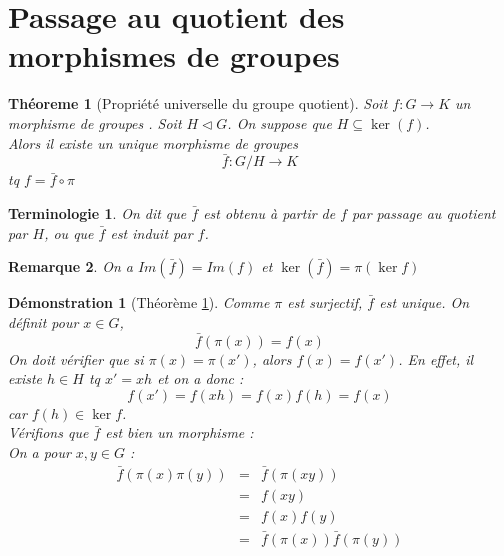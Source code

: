 \documentclass[a4paper, oneside]{report}
\theoremstyle{break}
\newtheorem{thm}{Théoreme}[section] %
\newtheorem{remar}[thm]{Remarque}
\newtheorem*{term}{Terminologie}
\newtheorem*{demo}{Démonstration}
\newcommand{\mdg}{morphisme de groupes }
\newcommand{\mdgs}{morphismes de groupes }
\begin{document}
\section{Passage au quotient des \mdgs}


\begin{thm}[Propriété universelle du groupe quotient]
\label{thm_prop_univ}
Soit $f:G\rightarrow K$ un \mdg. Soit $H\vartriangleleft G$. On suppose que $H\subseteq \ker (f)$.\\
Alors il existe un unique \mdg 
$$\bar{f} : G/H \rightarrow K$$
tq $f=\bar{f}\circ \pi$

\begin{center}
\end{center}

\end{thm}

\begin{term}
On dit que $\bar{f}$ est obtenu à partir de $f$ par passage au quotient par $H$, ou que $\bar{f}$ est induit par $f$.
\end{term}

\begin{remar}
On a $Im(\bar{f})=Im(f)$ et $\ker(\bar{f})=\pi(\ker f)$
\end{remar}

\begin{demo}[Théorème \ref{thm_prop_univ}]
Comme $\pi$ est surjectif, $\bar{f}$ est unique. On définit pour $x\in G$, 
$$\bar{f}(\pi(x))=f(x)$$
On doit vérifier que si $\pi(x)=\pi(x')$, alors $f(x)=f(x')$. En effet, il existe $h\in H$ tq $x'=xh$ et on a donc :
$$f(x')=f(xh)=f(x)f(h)=f(x)$$
car $f(h)\in \ker f$.\\
Vérifions que $\bar{f}$ est bien un morphisme :\\
On a pour $x,y\in G$ :
$$\begin{array}{lll}
\bar{f}(\pi(x)\pi(y))&=&\bar{f}(\pi(xy))\\
&=& f(xy)\\
&=& f(x)f(y)\\
&=& \bar{f}(\pi(x))\bar{f}(\pi(y))
\end{array}$$
~
\end{demo}
\end{document}
